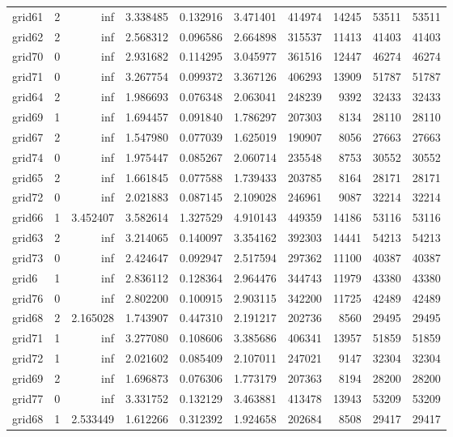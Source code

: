 \begin{longtable}{|l|r|r|r|r|r|r|r|r|r|}
grid61 & 2 & inf & 3.338485 & 0.132916 & 3.471401 & 414974 & 14245 & 53511 & 53511 \\
grid62 & 2 & inf & 2.568312 & 0.096586 & 2.664898 & 315537 & 11413 & 41403 & 41403 \\
grid70 & 0 & inf & 2.931682 & 0.114295 & 3.045977 & 361516 & 12447 & 46274 & 46274 \\
grid71 & 0 & inf & 3.267754 & 0.099372 & 3.367126 & 406293 & 13909 & 51787 & 51787 \\
grid64 & 2 & inf & 1.986693 & 0.076348 & 2.063041 & 248239 & 9392 & 32433 & 32433 \\
grid69 & 1 & inf & 1.694457 & 0.091840 & 1.786297 & 207303 & 8134 & 28110 & 28110 \\
grid67 & 2 & inf & 1.547980 & 0.077039 & 1.625019 & 190907 & 8056 & 27663 & 27663 \\
grid74 & 0 & inf & 1.975447 & 0.085267 & 2.060714 & 235548 & 8753 & 30552 & 30552 \\
grid65 & 2 & inf & 1.661845 & 0.077588 & 1.739433 & 203785 & 8164 & 28171 & 28171 \\
grid72 & 0 & inf & 2.021883 & 0.087145 & 2.109028 & 246961 & 9087 & 32214 & 32214 \\
grid66 & 1 & 3.452407 & 3.582614 & 1.327529 & 4.910143 & 449359 & 14186 & 53116 & 53116 \\
grid63 & 2 & inf & 3.214065 & 0.140097 & 3.354162 & 392303 & 14441 & 54213 & 54213 \\
grid73 & 0 & inf & 2.424647 & 0.092947 & 2.517594 & 297362 & 11100 & 40387 & 40387 \\
grid6 & 1 & inf & 2.836112 & 0.128364 & 2.964476 & 344743 & 11979 & 43380 & 43380 \\
grid76 & 0 & inf & 2.802200 & 0.100915 & 2.903115 & 342200 & 11725 & 42489 & 42489 \\
grid68 & 2 & 2.165028 & 1.743907 & 0.447310 & 2.191217 & 202736 & 8560 & 29495 & 29495 \\
grid71 & 1 & inf & 3.277080 & 0.108606 & 3.385686 & 406341 & 13957 & 51859 & 51859 \\
grid72 & 1 & inf & 2.021602 & 0.085409 & 2.107011 & 247021 & 9147 & 32304 & 32304 \\
grid69 & 2 & inf & 1.696873 & 0.076306 & 1.773179 & 207363 & 8194 & 28200 & 28200 \\
grid77 & 0 & inf & 3.331752 & 0.132129 & 3.463881 & 413478 & 13943 & 53209 & 53209 \\
grid68 & 1 & 2.533449 & 1.612266 & 0.312392 & 1.924658 & 202684 & 8508 & 29417 & 29417 \\

\end{longtable}
